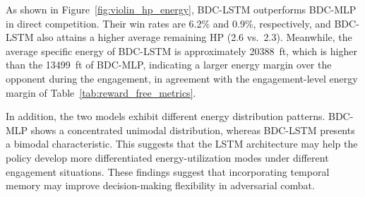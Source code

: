 \documentclass[pdflatex,sn-mathphys-num]{sn-jnl}%
\theoremstyle{thmstyleone}%
\theoremstyle{thmstyletwo}%
\theoremstyle{thmstylethree}%
\begin{document}
As shown in Figure~\ref{fig:violin_hp_energy}, BDC-LSTM outperforms BDC-MLP in direct competition. Their win rates are 6.2\% and 0.9\%, respectively, and BDC-LSTM also attains a higher average remaining HP (2.6 vs.\ 2.3). Meanwhile, the average specific energy of BDC-LSTM is approximately 20388~ft, which is higher than the 13499~ft of BDC-MLP, indicating a larger energy margin over the opponent during the engagement, in agreement with the engagement-level energy margin of Table~\ref{tab:reward_free_metrics}.

In addition, the two models exhibit different energy distribution patterns. BDC-MLP shows a concentrated unimodal distribution, whereas BDC-LSTM presents a bimodal characteristic. This suggests that the LSTM architecture may help the policy develop more differentiated energy-utilization modes under different engagement situations. These findings suggest that incorporating temporal memory may improve decision-making flexibility in adversarial combat.




\end{document}
